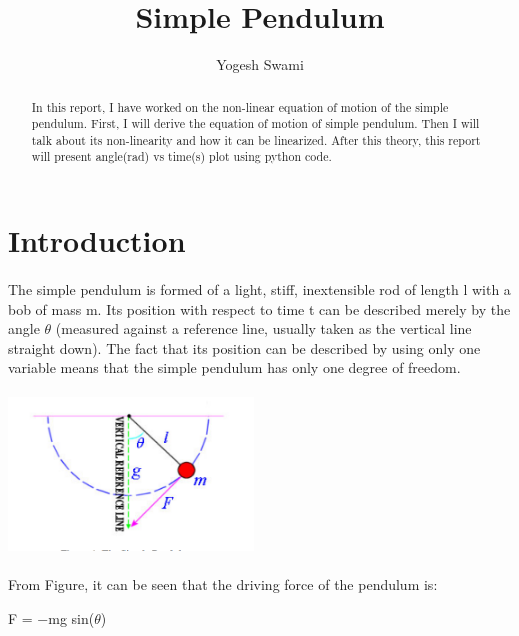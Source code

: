 \documentclass{article}
\begin{document}
  




\title{Simple Pendulum}

\author{Yogesh Swami}
\maketitle
 
 
 
\begin{abstract}
In this report, I have worked on the non-linear equation of motion of the simple pendulum. First, I will derive the equation of motion of simple pendulum. Then I will talk about its non-linearity and how it can be linearized. After this theory, this report will present angle(rad) vs time(s) plot using python code.
\end{abstract}


\section{Introduction}
\paragraph{}The simple pendulum is formed of a light, stiff, inextensible rod of length l with a bob of mass m. Its position with respect to time t can be described merely by the angle $\theta$ (measured against a reference line, usually taken as the vertical line straight down). The fact that its position can be described by using only one variable means that the simple pendulum has only one degree of freedom.
\paragraph{}
\includegraphics[width=65mm]{pendulum.png}
\paragraph{}From Figure, it can be seen that the driving force of the pendulum is: \begin{center}
F = −mg sin($\theta$)
\end{center}
\end{document}
